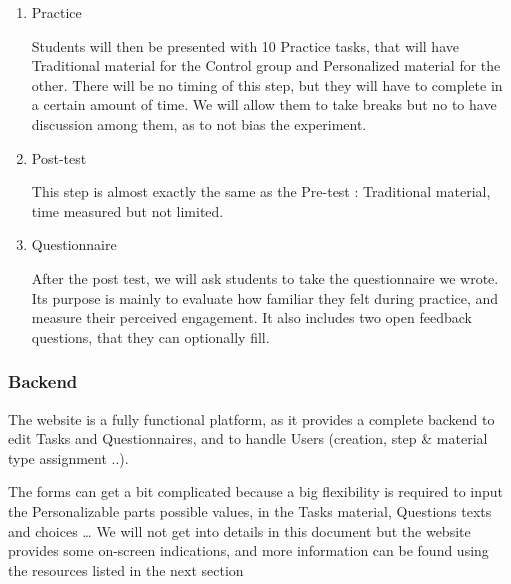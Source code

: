\documentclass[a4paper,12pt]{article}
\begin{document}
\begin{enumerate}
\item Practice

Students will then be presented with 10 Practice tasks, that will have Traditional material for the Control group and Personalized material for the other. There will be no timing of this step, but they will have to complete in a certain amount of time. We will allow them to take breaks but no to have discussion among them, as to not bias the experiment.

\item Post-test

This step is almost exactly the same as the Pre-test : Traditional material, time measured but not limited.

\item Questionnaire

After the post test, we will ask students to take the questionnaire we wrote. Its purpose is mainly to evaluate how familiar they felt during practice, and measure their perceived engagement.
It also includes two open feedback questions, that they can optionally fill.

\end{enumerate}


\subsubsection{Backend}

The website is a fully functional platform, as it provides a complete backend to edit Tasks and Questionnaires, and to handle Users (creation, step \& material type assignment ..).

The forms can get a bit complicated because a big flexibility is required to input the Personalizable parts possible values, in the Tasks material, Questions texts and choices … We will not get into details in this document but the website provides some on-screen indications, and more information can be found using the resources listed in the next section
\end{document}
